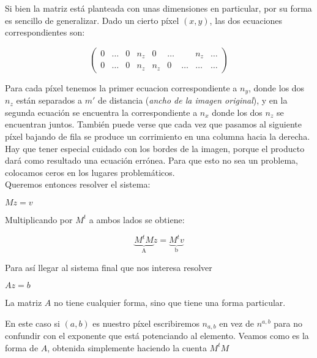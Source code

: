 Si bien la matriz está planteada con unas dimensiones en particular, por su forma es sencillo de generalizar. Dado un cierto píxel $(x, y)$, las dos ecuaciones correspondientes son:

\[
\begin{pmatrix}
    0 & \dots & 0 & n_{z} & 0     & \dots &       & n_{z} & \dots  \\
    0 & \dots & 0 & n_{z} & n_{z} & 0     & \dots & \dots & \dots
\end{pmatrix}
\]

Para cada píxel tenemos la primer ecuacion correspondiente a $n_y$, donde los dos $n_z$ están separados a $m'$ de distancia (\textit{ancho de la imagen original}), y en la segunda ecuación se encuentra la correspondiente a $n_x$ donde los dos $n_z$ se encuentran juntos. También puede verse que cada vez que pasamos al siguiente píxel bajando de fila se produce un corrimiento en una columna hacia la derecha. Hay que tener especial cuidado con los bordes de la imagen, porque el producto dará como resultado una ecuación errónea. Para que esto no sea un problema, colocamos ceros en los lugares problemáticos. \\

Queremos entonces resolver el sistema:

\begin{center}
$M z = v$
\end{center}

Multiplicando por $M^{t}$ a ambos lados se obtiene:
\begin{center}
\[\underbrace{M^{t} M}_{\text{A}} z = \underbrace{M^{t} v}_{\text{b}}\]
\end{center}

Para así llegar al sistema final que nos interesa resolver
\begin{center}
$A z = b$
\end{center}

La matriz $A$ no tiene cualquier forma, sino que tiene una forma particular.

En este caso si $(a, b)$ es nuestro píxel escribiremos  $n_{a,b}$ en vez de $n^{a,b}$ para no confundir con el exponente que está potenciando al elemento. Veamos como es la forma de $A$, obtenida simplemente haciendo la cuenta $M^t M$


